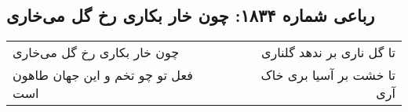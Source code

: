 \begin{center}
\section*{رباعی شماره ۱۸۳۴: چون خار بکاری رخ گل می‌خاری}
\label{sec:1834}
\begin{longtable}{l p{0.5cm} r}
چون خار بکاری رخ گل می‌خاری
&&
تا گل ناری بر ندهد گلناری
\\
فعل تو چو تخم و این جهان طاهون است
&&
تا خشت بر آسیا بری خاک آری
\\
\end{longtable}
\end{center}
